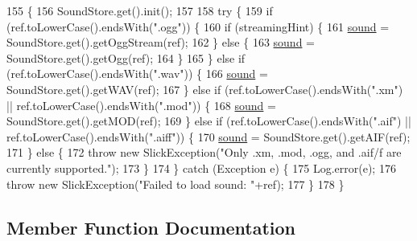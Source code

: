 \begin{DoxyCode}
155                                                                           \{
156         SoundStore.get().init();
157         
158         \textcolor{keywordflow}{try} \{
159             \textcolor{keywordflow}{if} (ref.toLowerCase().endsWith(\textcolor{stringliteral}{".ogg"})) \{
160                 \textcolor{keywordflow}{if} (streamingHint) \{
161                     \mbox{\hyperlink{classorg_1_1newdawn_1_1slick_1_1_music_a17daed326f24bf361ff8677c33f06b2f}{sound}} = SoundStore.get().getOggStream(ref);
162                 \} \textcolor{keywordflow}{else} \{
163                     \mbox{\hyperlink{classorg_1_1newdawn_1_1slick_1_1_music_a17daed326f24bf361ff8677c33f06b2f}{sound}} = SoundStore.get().getOgg(ref);
164                 \}
165             \} \textcolor{keywordflow}{else} \textcolor{keywordflow}{if} (ref.toLowerCase().endsWith(\textcolor{stringliteral}{".wav"})) \{
166                 \mbox{\hyperlink{classorg_1_1newdawn_1_1slick_1_1_music_a17daed326f24bf361ff8677c33f06b2f}{sound}} = SoundStore.get().getWAV(ref);
167             \} \textcolor{keywordflow}{else} \textcolor{keywordflow}{if} (ref.toLowerCase().endsWith(\textcolor{stringliteral}{".xm"}) || ref.toLowerCase().endsWith(\textcolor{stringliteral}{".mod"})) \{
168                 \mbox{\hyperlink{classorg_1_1newdawn_1_1slick_1_1_music_a17daed326f24bf361ff8677c33f06b2f}{sound}} = SoundStore.get().getMOD(ref);
169             \} \textcolor{keywordflow}{else} \textcolor{keywordflow}{if} (ref.toLowerCase().endsWith(\textcolor{stringliteral}{".aif"}) || ref.toLowerCase().endsWith(\textcolor{stringliteral}{".aiff"})) \{
170                 \mbox{\hyperlink{classorg_1_1newdawn_1_1slick_1_1_music_a17daed326f24bf361ff8677c33f06b2f}{sound}} = SoundStore.get().getAIF(ref);
171             \} \textcolor{keywordflow}{else} \{
172                 \textcolor{keywordflow}{throw} \textcolor{keyword}{new} SlickException(\textcolor{stringliteral}{"Only .xm, .mod, .ogg, and .aif/f are currently supported."});
173             \}
174         \} \textcolor{keywordflow}{catch} (Exception e) \{
175             Log.error(e);
176             \textcolor{keywordflow}{throw} \textcolor{keyword}{new} SlickException(\textcolor{stringliteral}{"Failed to load sound: "}+ref);
177         \}
178     \}
\end{DoxyCode}


\subsection{Member Function Documentation}
\mbox{\label{classorg_1_1newdawn_1_1slick_1_1_music_a86c7f8a44c5d7a7f3226a1211b7d2b65}} 
